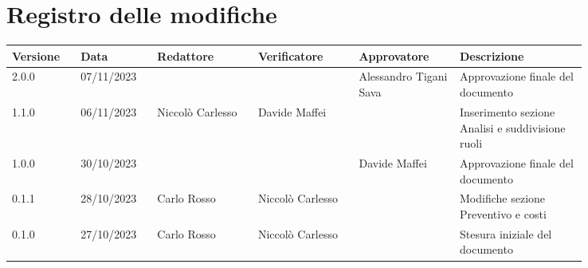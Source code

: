 
\section*{Registro delle modifiche}
{
\renewcommand{\arraystretch}{1.5}
\scriptsize
\begin{tabular}{p{0.10\linewidth}p{0.10\linewidth}p{0.15\linewidth}p{0.15\linewidth}p{0.15\linewidth}p{0.19\linewidth}}
    \textbf{Versione}  & \textbf{Data}  & \textbf{Redattore}    & \textbf{Verificatore} & \textbf{Approvatore}  & \textbf{Descrizione}  \\
    \hline
	2.0.0 & 07/11/2023 &                &                  & Alessandro Tigani Sava & Approvazione finale del documento     \\
    \hline
    1.1.0 & 06/11/2023 & Niccolò Carlesso    & Davide Maffei &               & Inserimento sezione Analisi e suddivisione ruoli   \\
    \hline
	1.0.0 & 30/10/2023 &                &                  & Davide Maffei & Approvazione finale del documento     \\
    \hline
    0.1.1 & 28/10/2023 & Carlo Rosso    & Niccolò Carlesso &               & Modifiche sezione Preventivo e costi  \\
    \hline
	0.1.0 & 27/10/2023 & Carlo Rosso    & Niccolò Carlesso &               & Stesura iniziale del documento        \\
    \hline
\end{tabular}
}

